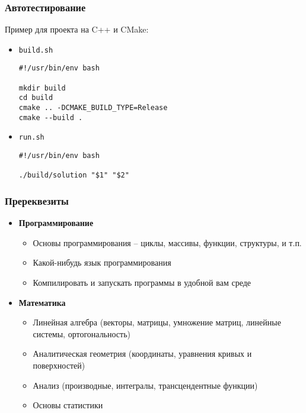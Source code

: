 \documentclass[10pt]{beamer}
\begin{document}
\begin{frame}[fragile]
\frametitle{Автотестирование}
Пример для проекта на C++ и CMake:
\begin{itemize}
\item \texttt{build.sh}
\begin{verbatim}
#!/usr/bin/env bash

mkdir build
cd build
cmake .. -DCMAKE_BUILD_TYPE=Release
cmake --build .
\end{verbatim}
\item \texttt{run.sh}
\begin{verbatim}
#!/usr/bin/env bash

./build/solution "$1" "$2"
\end{verbatim}
\end{itemize}
\end{frame}

\begin{frame}
\frametitle{Пререквезиты}
\pause
\begin{itemize}
\item \textbf{Программирование}
\pause
\begin{itemize}
\item Основы программирования -- циклы, массивы, функции, структуры, и т.п.
\pause
\item Какой-нибудь язык программирования
\pause
\item Компилировать и запускать программы в удобной вам среде
\end{itemize}
\pause
\item \textbf{Математика}
\pause
\begin{itemize}
\item Линейная алгебра (векторы, матрицы, умножение матриц, линейные системы, ортогональность)
\pause
\item Аналитическая геометрия (координаты, уравнения кривых и поверхностей)
\pause
\item Анализ (производные, интегралы, трансцендентные функции)
\pause
\item Основы статистики
\end{itemize}
\end{itemize}
\end{frame}
\end{document}
